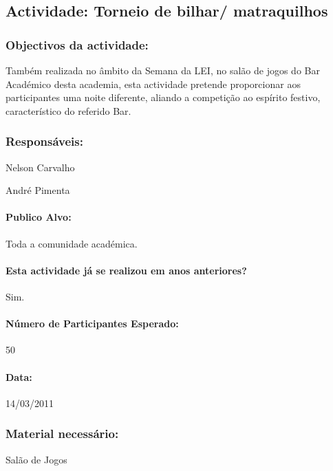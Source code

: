 \subsection{Actividade: Torneio de bilhar/ matraquilhos} %

\subsubsection*{Objectivos da actividade:}
Também realizada no âmbito da Semana da LEI, no salão de jogos do Bar Académico desta academia, esta actividade pretende proporcionar aos participantes uma noite diferente, aliando a competição ao espírito festivo, característico do referido Bar.

\subsubsection*{Responsáveis:}
\begin{itemizedash}
	\item{Nelson Carvalho}
	\item{André Pimenta}
\end{itemizedash}

\paragraph{Publico Alvo: }
Toda a comunidade académica.
\paragraph{Esta actividade já se realizou em anos anteriores?}
Sim.

\paragraph{Número de Participantes Esperado:}
50

\paragraph{Data:} 14/03/2011

\subsubsection*{Material necessário:}
\begin{itemizedash}
	\item{Salão de Jogos}
\end{itemizedash}


